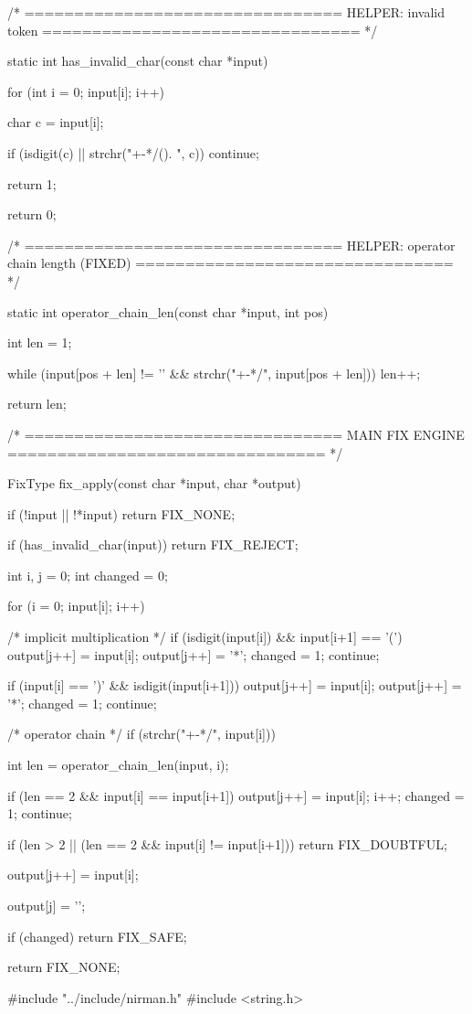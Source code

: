 \documentclass{article}
\begin{document}
/* ================================
   HELPER: invalid token
================================ */

static int has_invalid_char(const char *input)
{
    for (int i = 0; input[i]; i++)
    {
        char c = input[i];

        if (isdigit(c) || strchr("+-*/(). ", c))
            continue;

        return 1;
    }
    return 0;
}


/* ================================
   HELPER: operator chain length (FIXED)
================================ */

static int operator_chain_len(const char *input, int pos)
{
    int len = 1;

    while (input[pos + len] != '\0' &&
           strchr("+-*/", input[pos + len]))
    {
        len++;
    }

    return len;
}


/* ================================
   MAIN FIX ENGINE
================================ */

FixType fix_apply(const char *input, char *output)
{
    if (!input || !*input)
        return FIX_NONE;

    if (has_invalid_char(input))
        return FIX_REJECT;

    int i, j = 0;
    int changed = 0;

    for (i = 0; input[i]; i++)
    {
        /* implicit multiplication */
        if (isdigit(input[i]) && input[i+1] == '(')
        {
            output[j++] = input[i];
            output[j++] = '*';
            changed = 1;
            continue;
        }

        if (input[i] == ')' && isdigit(input[i+1]))
        {
            output[j++] = input[i];
            output[j++] = '*';
            changed = 1;
            continue;
        }

        /* operator chain */
        if (strchr("+-*/", input[i]))
        {
            int len = operator_chain_len(input, i);

            if (len == 2 && input[i] == input[i+1])
            {
                output[j++] = input[i];
                i++;
                changed = 1;
                continue;
            }

            if (len > 2 || (len == 2 && input[i] != input[i+1]))
            {
                return FIX_DOUBTFUL;
            }
        }

        output[j++] = input[i];
    }

    output[j] = '\0';

    if (changed)
        return FIX_SAFE;

    return FIX_NONE;
}
#include "../include/nirman.h"
#include <string.h>
\end{document}
